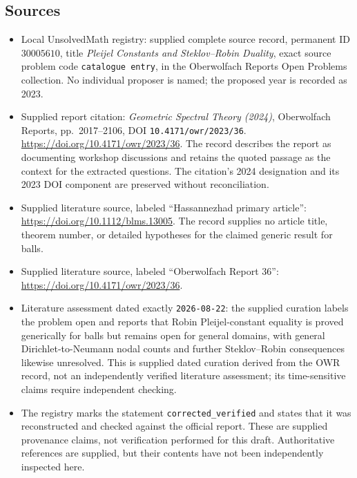 \documentclass[11pt]{article}
\begin{document}
\subsection{Sources}
\begin{itemize}
\item Local UnsolvedMath registry: supplied complete source record, permanent ID \(30005610\), title \emph{Pleijel Constants and Steklov--Robin Duality}, exact source problem code \texttt{catalogue entry}, in the Oberwolfach Reports Open Problems collection. No individual proposer is named; the proposed year is recorded as 2023.
\item Supplied report citation: \emph{Geometric Spectral Theory (2024)}, Oberwolfach Reports, pp.~2017--2106, DOI \texttt{10.4171/owr/2023/36}. \url{https://doi.org/10.4171/owr/2023/36}. The record describes the report as documenting workshop discussions and retains the quoted passage as the context for the extracted questions. The citation's 2024 designation and its 2023 DOI component are preserved without reconciliation.
\item Supplied literature source, labeled ``Hassannezhad primary article'': \url{https://doi.org/10.1112/blms.13005}. The record supplies no article title, theorem number, or detailed hypotheses for the claimed generic result for balls.
\item Supplied literature source, labeled ``Oberwolfach Report 36'': \url{https://doi.org/10.4171/owr/2023/36}.
\item Literature assessment dated exactly \texttt{2026-08-22}: the supplied curation labels the problem open and reports that Robin Pleijel-constant equality is proved generically for balls but remains open for general domains, with general Dirichlet-to-Neumann nodal counts and further Steklov--Robin consequences likewise unresolved. This is supplied dated curation derived from the OWR record, not an independently verified literature assessment; its time-sensitive claims require independent checking.
\item The registry marks the statement \texttt{corrected\_verified} and states that it was reconstructed and checked against the official report. These are supplied provenance claims, not verification performed for this draft. Authoritative references are supplied, but their contents have not been independently inspected here.
\end{itemize}
\end{document}
